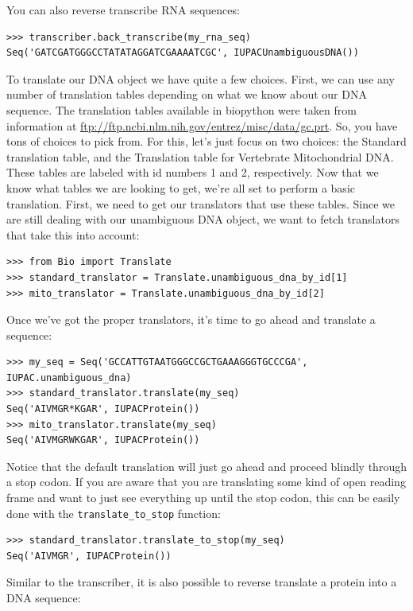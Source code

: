 \documentclass{report}
\begin{document}
You can also reverse transcribe RNA sequences:

\begin{verbatim}
>>> transcriber.back_transcribe(my_rna_seq)
Seq('GATCGATGGGCCTATATAGGATCGAAAATCGC', IUPACUnambiguousDNA())
\end{verbatim}


To translate our DNA object we have quite a few choices. First, we can use any number of translation tables depending on what we know about our DNA sequence. The translation tables available in biopython were taken from information at \url{ftp://ftp.ncbi.nlm.nih.gov/entrez/misc/data/gc.prt}. So, you have tons of choices to pick from. For this, let's just focus on two choices: the Standard translation table, and the Translation table for Vertebrate Mitochondrial DNA. These tables are labeled with id numbers 1 and 2, respectively. Now that we know what tables we are looking to get, we're all set to perform a basic translation. First, we need to get our translators that use these tables. Since we are still dealing with our unambiguous DNA object, we want to fetch translators that take this into account:

\begin{verbatim}
>>> from Bio import Translate
>>> standard_translator = Translate.unambiguous_dna_by_id[1] 
>>> mito_translator = Translate.unambiguous_dna_by_id[2]
\end{verbatim}

Once we've got the proper translators, it's time to go ahead and translate a sequence:

\begin{verbatim}
>>> my_seq = Seq('GCCATTGTAATGGGCCGCTGAAAGGGTGCCCGA', IUPAC.unambiguous_dna)
>>> standard_translator.translate(my_seq)
Seq('AIVMGR*KGAR', IUPACProtein())
>>> mito_translator.translate(my_seq)
Seq('AIVMGRWKGAR', IUPACProtein())
\end{verbatim}

Notice that the default translation will just go ahead and proceed blindly through a stop codon. If you are aware that you are translating some kind of open reading frame and want to just see everything up until the stop codon, this can be easily done with the \verb|translate_to_stop| function:

\begin{verbatim}
>>> standard_translator.translate_to_stop(my_seq)
Seq('AIVMGR', IUPACProtein())
\end{verbatim}

Similar to the transcriber, it is also possible to reverse translate a protein into a DNA sequence:
\end{document}
